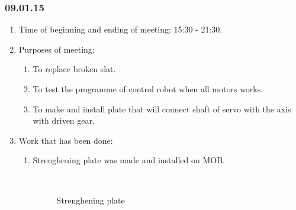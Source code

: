 \subsubsection{09.01.15}
\begin{enumerate}
	
	\item Time of beginning and ending of meeting: 15:30 - 21:30.
	
	\item Purposes of meeting: 
	\begin{enumerate}
		
		\item To replace broken slat.
		
		\item To test the programme of control robot when all motors works.
		
		\item To make and install plate that will connect shaft of servo with the axis with driven gear.
		
	\end{enumerate}

	\item Work that has been done:
	\begin{enumerate}
		
		\item Strenghening plate was made and installed on MOB.
				\begin{figure}[H]
					\begin{minipage}[h]{0.2\linewidth}
						\center  
					\end{minipage}
					\begin{minipage}[h]{0.6\linewidth}
						\caption{Strenghening plate}
					\end{minipage}
				\end{figure}
		

\end{enumerate}
\end{enumerate}
